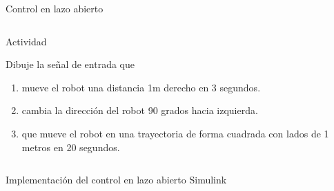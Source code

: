 \documentclass[presentation,aspectratio=169]{beamer}
\begin{document}
\begin{frame}[label={sec:org3701b17}]{Control en lazo abierto}
\begin{columns}
\begin{column}{0.6\columnwidth}
\pause

\alert{Actividad}

Dibuje la señal de entrada que 
\begin{enumerate}
\item mueve el robot una distancia 1m derecho en 3 segundos.
\item cambia la dirección del robot 90 grados hacia izquierda.
\item que mueve el robot en una trayectoria de forma cuadrada con lados de 1 metros en 20 segundos.
\end{enumerate}
\end{column}
\end{columns}
\end{frame}

\begin{frame}[label={sec:org87fa774}]{Implementación del control en lazo abierto}
Simulink
\end{frame}
\end{document}

